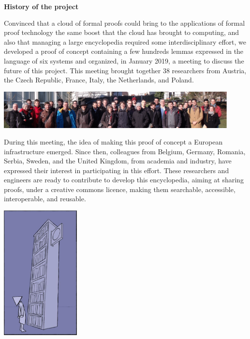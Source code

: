 \begin{shaded}
  \vspace*{-0.5cm}
  \begin{center}
    {\bf \Large History of the project}
  \end{center}

Convinced that a cloud of formal proofs could bring to the
applications of formal proof technology the same boost that the cloud
has brought to computing, and also that managing a large encyclopedia
required some interdisciplinary effort,
we developed a proof of concept containing a few hundreds lemmas
expressed in the language of six systems and organized, in January 2019,
a meeting to discuss the future of this project.
This
meeting brought together 38 researchers from Austria, the Czech
Republic, France, Italy, the Netherlands, and Poland.
\begin{center}
\includegraphics[height=2cm]{img/Photo-reduced.png}
\end{center}
During this meeting, the idea of making this proof of concept a
European infrastructure emerged.  Since then, colleagues from Belgium,
Germany, Romania, Serbia, Sweden, and the United Kingdom, from
academia and industry, have expressed their interest in participating
in this effort.  These researchers and engineers are ready to
contribute to develop this encyclopedia, aiming at sharing proofs,
under a creative commons licence, making them searchable, accessible,
interoperable, and reusable.
\end{shaded}


\begin{center}
\includegraphics[width=4cm]{img/Illustration1-reduced.jpg}
\end{center}


